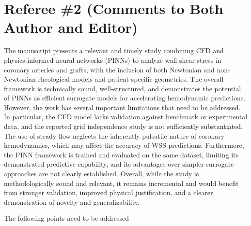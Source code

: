 \documentclass[11pt]{article}
\begin{document}
\newpage
\section*{Referee \#2 (Comments to Both Author and Editor)}

The manuscript presents a relevant and timely study combining CFD and physics-informed neural networks (PINNs) to analyze wall shear stress in coronary arteries and grafts, with the inclusion of both Newtonian and non-Newtonian rheological models and patient-specific geometries. The overall framework is technically sound, well-structured, and demonstrates the potential of PINNs as efficient surrogate models for accelerating hemodynamic predictions. However, the work has several important limitations that need to be addressed. In particular, the CFD model lacks validation against benchmark or experimental data, and the reported grid independence study is not sufficiently substantiated. The use of steady flow neglects the inherently pulsatile nature of coronary hemodynamics, which may affect the accuracy of WSS predictions. Furthermore, the PINN framework is trained and evaluated on the same dataset, limiting its demonstrated predictive capability, and its advantages over simpler surrogate approaches are not clearly established. Overall, while the study is methodologically sound and relevant, it remains incremental and would benefit from stronger validation, improved physical justification, and a clearer demonstration of novelty and generalizability.

The following points need to be addressed
\end{document}

